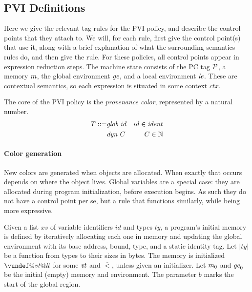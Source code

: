 \documentclass{article}
\begin{document}
\subsection{PVI Definitions}

Here we give the relevant tag rules for the PVI policy, and describe the control points that
they attach to. We will, for each rule, first give the control point(s) that use it, along
with a brief explanation of what the surrounding semantics rules do, and then give the rule.
For these policies, all control points appear in expression reduction steps.
The machine state consists of the PC tag \(\mathcal{P}\), a memory \(m\),
the global environment \(\mathit{ge}\), and a local environment \(\mathit{le}\). These are contextual semantics,
so each expression is situated in some context \(\mathit{ctx}\).

The core of the PVI policy is the {\it provenance color}, represented
by a natural number.
%
\begin{align*}
  T ::= & \mathit{glob} ~ id & id \in \mathit{ident} \\
  & \mathit{dyn} ~ C & C \in \mathbb{N} \\
\end{align*}

\paragraph*{Color generation}

New colors are generated when objects are allocated. When exactly that occurs
depends on where the object lives. Global variables are a special case: they are
allocated during program initialization, before execution begins. As such they
do not have a control point per se, but a rule that functions similarly, while
being more expressive.


Given a list \(xs\) of variable identifiers \(id\) and types
\(ty\), a program's initial memory is defined by iteratively allocating each one
in memory and updating the global environment with its base address, bound, type,
and a static identity tag. Let \(|ty|\) be a function from types to their sizes
in bytes. The memory is initialized \(\vundef@\vt@\overline{\lt}\)
for some \(\mathit{vt}\) and \(\overline{\lt}\), unless given an initializer.
Let \(m_0\) and \(\mathit{ge}_0\) be the initial (empty) memory and environment.
The parameter \(b\) marks the start of the global region.
\end{document}
